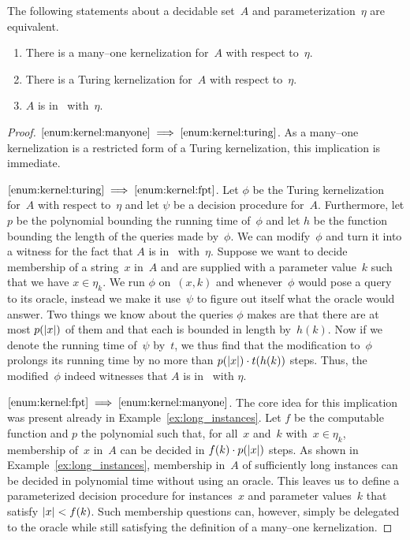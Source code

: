 \begin{theorem}
\label{thm:kernel_fpt}%
  The following statements about a decidable set~$A$ and parameterization~$\eta$ are equivalent.
  \begin{enumerate}
  \item\label{enum:kernel:manyone}
    There is a many--one kernelization for~$A$ with respect to~$\eta$.
  \item\label{enum:kernel:turing}
    There is a Turing kernelization for~$A$ with respect to~$\eta$.
  \item\label{enum:kernel:fpt}
    $A$ is in~ with~$\eta$.
  \end{enumerate}
\end{theorem}
\begin{proof}
$\ref{enum:kernel:manyone} \implies \ref{enum:kernel:turing}$.
  As a many--one kernelization is a restricted form of a Turing kernelization, this implication is immediate.

$\ref{enum:kernel:turing} \implies \ref{enum:kernel:fpt}$.
  Let $\phi$ be the Turing kernelization for~$A$ with respect to~$\eta$ and let $\psi$ be a decision procedure for~$A$.
  Furthermore, let $p$ be the polynomial bounding the running time of~$\phi$ and let $h$ be the function bounding the length of the queries made by~$\phi$.
  We can modify~$\phi$ and turn it into a witness for the fact that $A$ is in~ with~$\eta$.
  Suppose we want to decide membership of a string~$x$ in~$A$ and are supplied with a parameter value~$k$ such that we have $x \in \eta_k$.
  We run $\phi$ on~$(x, k)$ and whenever~$\phi$ would pose a query to its oracle, instead we make it use~$\psi$ to figure out itself what the oracle would answer.
  Two things we know about the queries $\phi$ makes are that there are at most $p({\lvert x\rvert})$ of them and that each is bounded in length by~$h(k)$.
  Now if we denote the running time of~$\psi$ by~$t$, we thus find that the modification to~$\phi$ prolongs its running time by no more than $p({\lvert x\rvert}) \cdot t(h(k))$ steps.
  Thus, the modified~$\phi$ indeed witnesses that $A$ is in~ with $\eta$.

$\ref{enum:kernel:fpt} \implies \ref{enum:kernel:manyone}$.
  The core idea for this implication was present already in Example~\ref{ex:long_instances}.
  Let $f$ be the computable function and $p$ the polynomial such that, for all~$x$ and~$k$ with~$x \in \eta_k$, membership of~$x$ in~$A$ can be decided in $f(k) \cdot p({\lvert x\rvert})$ steps.
  As shown in Example~\ref{ex:long_instances}, membership in~$A$ of sufficiently long instances can be decided in polynomial time without using an oracle.
  This leaves us to define a parameterized decision procedure for instances~$x$ and parameter values~$k$ that satisfy ${\lvert x\rvert} < f(k)$.
  Such membership questions can, however, simply be delegated to the oracle while still satisfying the definition of a many--one kernelization.
\end{proof}


